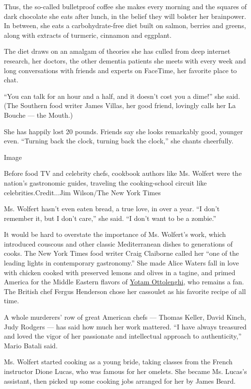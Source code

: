 Thus, the so-called bulletproof coffee she makes every morning and the
squares of dark chocolate she eats after lunch, in the belief they will
bolster her brainpower. In between, she eats a carbohydrate-free diet
built on salmon, berries and greens, along with extracts of turmeric,
cinnamon and eggplant.

The diet draws on an amalgam of theories she has culled from deep
internet research, her doctors, the other dementia patients she meets
with every week and long conversations with friends and experts on
FaceTime, her favorite place to chat.

``You can talk for an hour and a half, and it doesn't cost you a dime!''
she said. (The Southern food writer James Villas, her good friend,
lovingly calls her La Bouche --- the Mouth.)

She has happily lost 20 pounds. Friends say she looks remarkably good,
younger even. ``Turning back the clock, turning back the clock,'' she
chants cheerfully.

Image

Before food TV and celebrity chefs, cookbook authors like Ms. Wolfert
were the nation's gastronomic guides, traveling the cooking-school
circuit like celebrities.Credit...Jim Wilson/The New York Times

Ms. Wolfert hasn't even eaten bread, a true love, in over a year. ``I
don't remember it, but I don't care,'' she said. ``I don't want to be a
zombie.''

It would be hard to overstate the importance of Ms. Wolfert's work,
which introduced couscous and other classic Mediterranean dishes to
generations of cooks. The New York Times food writer Craig Claiborne
called her ``one of the leading lights in contemporary gastronomy.'' She
made Alice Waters fall in love with chicken cooked with preserved lemons
and olives in a tagine, and primed America for the Middle Eastern
flavors of
\href{https://www.nytimes3xbfgragh.onion/2017/02/07/dining/yotam-ottolenghi-baking-granita-kataifi.html?_r=0}{Yotam
Ottolenghi}, who remains a fan. The British chef Fergus Henderson chose
her cassoulet as his favorite recipe of all time.

A whole murderers' row of great American chefs --- Thomas Keller, David
Kinch, Judy Rodgers --- has said how much her work mattered. ``I have
always treasured and loved the vigor of her passionate and intellectual
approach to authenticity,'' Mario Batali said.

Ms. Wolfert started cooking as a young bride, taking classes from the
French instructor Dione Lucas, who was famous for her omelets. She
became Ms. Lucas's assistant, then picked up some cooking jobs arranged
for her by James Beard.

